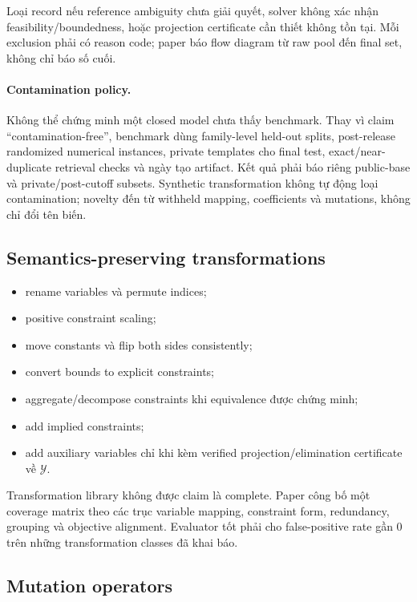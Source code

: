 \documentclass[11pt,a4paper]{article}
\begin{document}
Loại record nếu reference ambiguity chưa giải quyết, solver không xác nhận
feasibility/boundedness, hoặc projection certificate cần thiết không tồn tại.
Mỗi exclusion phải có reason code; paper báo flow diagram từ raw pool đến final
set, không chỉ báo số cuối.

\paragraph{Contamination policy.}
Không thể chứng minh một closed model chưa thấy benchmark. Thay vì claim
``contamination-free'', benchmark dùng family-level held-out splits,
post-release randomized numerical instances, private templates cho final test,
exact/near-duplicate retrieval checks và ngày tạo artifact. Kết quả phải báo
riêng public-base và private/post-cutoff subsets. Synthetic transformation
không tự động loại contamination; novelty đến từ withheld mapping, coefficients
và mutations, không chỉ đổi tên biến.

\subsection{Semantics-preserving transformations}

\begin{itemize}
  \item rename variables và permute indices;
  \item positive constraint scaling;
  \item move constants và flip both sides consistently;
  \item convert bounds to explicit constraints;
  \item aggregate/decompose constraints khi equivalence được chứng minh;
  \item add implied constraints;
  \item add auxiliary variables chỉ khi kèm verified projection/elimination
  certificate về \(\mathcal Y\).
\end{itemize}

Transformation library không được claim là complete. Paper công bố một coverage
matrix theo các trục variable mapping, constraint form, redundancy, grouping và
objective alignment. Evaluator tốt phải cho false-positive rate gần 0 trên
những transformation classes đã khai báo.

\subsection{Mutation operators}
\end{document}
